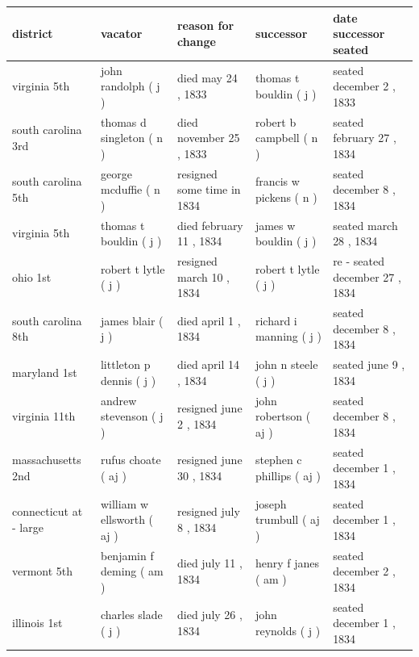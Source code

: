 \documentclass{article}
\begin{document}
\begin{tabular}{lllll}
\toprule
district & vacator & reason for change & successor & date successor seated \\
\midrule
virginia 5th & john randolph ( j ) & died may 24 , 1833 & thomas t bouldin ( j ) & seated december 2 , 1833 \\
south carolina 3rd & thomas d singleton ( n ) & died november 25 , 1833 & robert b campbell ( n ) & seated february 27 , 1834 \\
south carolina 5th & george mcduffie ( n ) & resigned some time in 1834 & francis w pickens ( n ) & seated december 8 , 1834 \\
virginia 5th & thomas t bouldin ( j ) & died february 11 , 1834 & james w bouldin ( j ) & seated march 28 , 1834 \\
ohio 1st & robert t lytle ( j ) & resigned march 10 , 1834 & robert t lytle ( j ) & re - seated december 27 , 1834 \\
south carolina 8th & james blair ( j ) & died april 1 , 1834 & richard i manning ( j ) & seated december 8 , 1834 \\
maryland 1st & littleton p dennis ( j ) & died april 14 , 1834 & john n steele ( j ) & seated june 9 , 1834 \\
virginia 11th & andrew stevenson ( j ) & resigned june 2 , 1834 & john robertson ( aj ) & seated december 8 , 1834 \\
massachusetts 2nd & rufus choate ( aj ) & resigned june 30 , 1834 & stephen c phillips ( aj ) & seated december 1 , 1834 \\
connecticut at - large & william w ellsworth ( aj ) & resigned july 8 , 1834 & joseph trumbull ( aj ) & seated december 1 , 1834 \\
vermont 5th & benjamin f deming ( am ) & died july 11 , 1834 & henry f janes ( am ) & seated december 2 , 1834 \\
illinois 1st & charles slade ( j ) & died july 26 , 1834 & john reynolds ( j ) & seated december 1 , 1834 \\
\bottomrule
\end{tabular}
\end{document}

